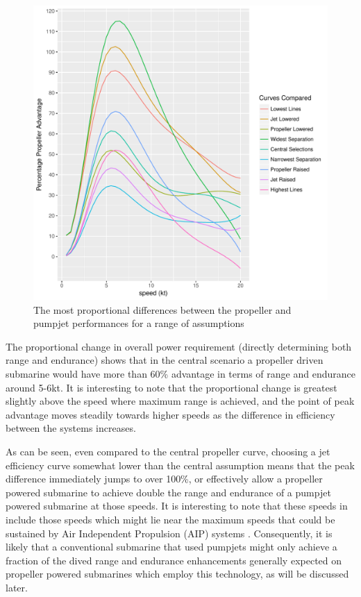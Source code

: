 \documentclass{article}\usepackage[]{graphicx}\usepackage[]{color}
\makeatletter
\def\maxwidth{ %
  \ifdim\Gin@nat@width>\linewidth
    \linewidth
  \else
    \Gin@nat@width
  \fi
}
\newenvironment{knitrout}{}{} %
\makeatother
\begin{document}
\begin{figure}
\begin{knitrout}
\color{fgcolor}

{\centering \includegraphics[width=\maxwidth]{figures/plots-plot_proportions-1} 

}



\end{knitrout}
\caption{The most proportional differences between the propeller and pumpjet performances for a range of assumptions}
\label{fig:all_proportions}
\end{figure}

The proportional change in overall power requirement (directly determining both range and endurance) shows that in the central scenario a propeller driven submarine would have more than 60\% advantage in terms of range and endurance around 5-6kt. It is interesting to note that the proportional change is greatest slightly above the speed where maximum range is achieved, and the point of peak advantage moves steadily towards higher speeds as the difference in efficiency between the systems increases.

As can be seen, even compared to the central propeller curve, choosing a jet efficiency curve somewhat lower than the central assumption means that the peak difference immediately jumps to over 100\%, or effectively allow a propeller powered submarine to achieve double the range and endurance of a pumpjet powered submarine at those speeds.  It is interesting to note that these speeds in include those speeds which might lie near the maximum speeds that could be sustained by Air Independent Propulsion (AIP) systems \parencite[100]{stanford2017}.  Consequently, it is likely that a conventional submarine that used pumpjets might only achieve a fraction of the dived range and endurance enhancements generally expected on propeller powered submarines which employ this technology, as will be discussed later.
\end{document}
